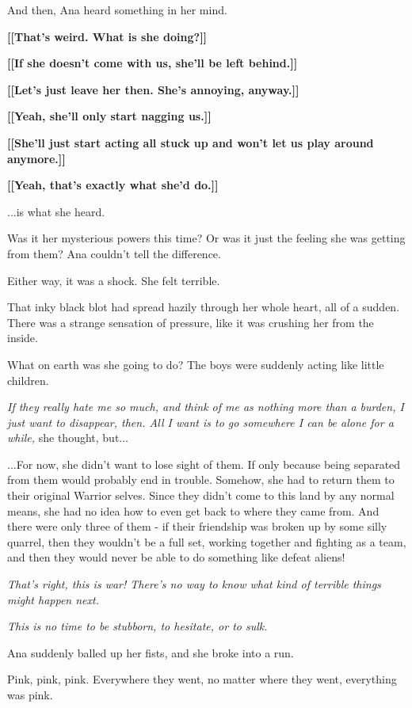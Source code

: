 \documentclass[
]{article}
\begin{document}
And then, Ana heard something in her mind.

\textbf{{[}{[}That's weird. What is she doing?{]}{]}}

\textbf{{[}{[}If she doesn't come with us, she'll be left behind.{]}{]}}

\textbf{{[}{[}Let's just leave her then. She's annoying, anyway.{]}{]}}

\textbf{{[}{[}Yeah, she'll only start nagging us.{]}{]}}

\textbf{{[}{[}She'll just start acting all stuck up and won't let us
play around anymore.{]}{]}}

\textbf{{[}{[}Yeah, that's exactly what she'd do.{]}{]}}

...is what she heard.

Was it her mysterious powers this time? Or was it just the feeling she
was getting from them? Ana couldn't tell the difference.

Either way, it was a shock. She felt terrible.

That inky black blot had spread hazily through her whole heart, all of a
sudden. There was a strange sensation of pressure, like it was crushing
her from the inside.

What on earth was she going to do? The boys were suddenly acting like
little children.

\emph{If they really hate me so much, and think of me as nothing more
than a burden, I just want to disappear, then. All I want is to go
somewhere I can be alone for a while, }she thought, but...

...For now, she didn't want to lose sight of them. If only because being
separated from them would probably end in trouble. Somehow, she had to
return them to their original Warrior selves. Since they didn't come to
this land by any normal means, she had no idea how to even get back to
where they came from. And there were only three of them - if their
friendship was broken up by some silly quarrel, then they wouldn't be a
full set, working together and fighting as a team, and then they would
never be able to do something like defeat aliens!

\emph{That's right, this is war! There's no way to know what kind of
terrible things might happen next.}

\emph{This is no time to be stubborn, to hesitate, or to sulk.}

Ana suddenly balled up her fists, and she broke into a run.

Pink, pink, pink. Everywhere they went, no matter where they went,
everything was pink.
\end{document}

